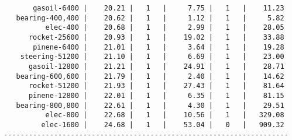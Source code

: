 \begin{verbatim}
       gasoil-6400 |    20.21 |   1   |     7.75 |   1   |    11.23
   bearing-400,400 |    20.62 |   1   |     1.12 |   1   |     5.82
          elec-400 |    20.68 |   1   |     2.99 |   1   |    28.05
      rocket-25600 |    20.93 |   1   |    19.02 |   1   |    33.88
       pinene-6400 |    21.01 |   1   |     3.64 |   1   |    19.28
    steering-51200 |    21.10 |   1   |     6.69 |   1   |    23.00
      gasoil-12800 |    21.21 |   1   |    24.91 |   1   |    28.71
   bearing-600,600 |    21.79 |   1   |     2.40 |   1   |    14.62
      rocket-51200 |    21.93 |   1   |    27.43 |   1   |    81.64
      pinene-12800 |    22.01 |   1   |     6.35 |   1   |    81.15
   bearing-800,800 |    22.61 |   1   |     4.30 |   1   |    29.51
          elec-800 |    22.68 |   1   |    10.56 |   1   |   329.08
         elec-1600 |    24.68 |   1   |    53.04 |   0   |   909.32
--------------------------------------------------------------------
\end{verbatim}
    
